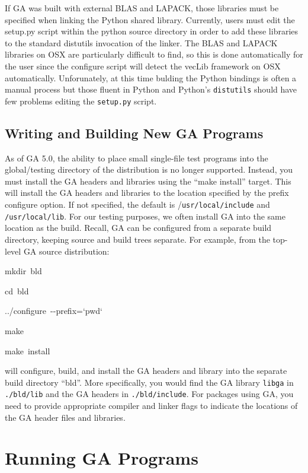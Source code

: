 If GA was built with external BLAS and LAPACK, those libraries must
be specified when linking the Python shared library. Currently, users
must edit the setup.py script within the python source directory in
order to add these libraries to the standard distutils invocation
of the linker. The BLAS and LAPACK libraries on OSX are particularly
difficult to find, so this is done automatically for the user since
the configure script will detect the vecLib framework on OSX automatically.
Unforunately, at this time bulding the Python bindings is often a
manual process but those fluent in Python and Python\textquoteright{}s
\texttt{distutils} should have few problems editing the \texttt{setup.py}
script. 


\subsection{Writing and Building New GA Programs }

As of GA 5.0, the ability to place small single-file test programs
into the global/testing directory of the distribution is no longer
supported. Instead, you must install the GA headers and libraries
using the \textquotedblleft{}make install\textquotedblright{} target.
This will install the GA headers and libraries to the location specified
by the \textendash{}prefix configure option. If not specified, the
default is /\texttt{usr/local/include} and \texttt{/usr/local/lib}.
For our testing purposes, we often install GA into the same location
as the build. Recall, GA can be configured from a separate build directory,
keeping source and build trees separate. For example, from the top-level
GA source distribution: 
\begin{lyxcode}
mkdir~bld~

cd~bld~

../configure~-{}-prefix=`pwd`~

make~

make~install~
\end{lyxcode}
will configure, build, and install the GA headers and library into
the separate build directory \textquotedblleft{}bld\textquotedblright{}.
More specifically, you would find the GA library \texttt{libga} in
\texttt{./bld/lib} and the GA headers in \texttt{./bld/include}. For
packages using GA, you need to provide appropriate compiler and linker
flags to indicate the locations of the GA header files and libraries. 


\section{Running GA Programs }

